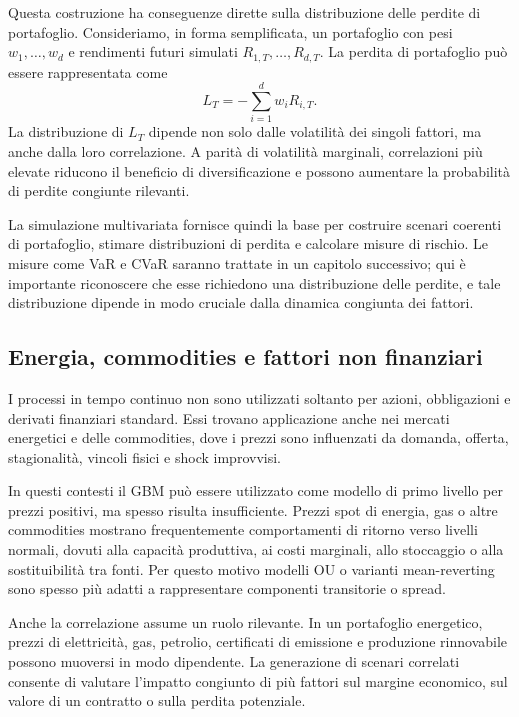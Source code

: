 Questa costruzione ha conseguenze dirette sulla distribuzione delle
perdite di portafoglio. Consideriamo, in forma semplificata, un
portafoglio con pesi $w_1,\ldots,w_d$ e rendimenti futuri simulati
$R_{1,T},\ldots,R_{d,T}$. La perdita di portafoglio pu\`{o} essere
rappresentata come
\[
L_T
=
-
\sum_{i=1}^{d}
w_i R_{i,T}.
\]
La distribuzione di $L_T$ dipende non solo dalle volatilit\`{a} dei singoli
fattori, ma anche dalla loro correlazione. A parit\`{a} di volatilit\`{a}
marginali, correlazioni pi\`{u} elevate riducono il beneficio di
diversificazione e possono aumentare la probabilit\`{a} di perdite
congiunte rilevanti.

La simulazione multivariata fornisce quindi la base per costruire scenari
coerenti di portafoglio, stimare distribuzioni di perdita e calcolare
misure di rischio. Le misure come VaR e CVaR saranno trattate in un
capitolo successivo; qui \`{e} importante riconoscere che esse richiedono
una distribuzione delle perdite, e tale distribuzione dipende in modo
cruciale dalla dinamica congiunta dei fattori.

\subsection*{Energia, commodities e fattori non finanziari}

I processi in tempo continuo non sono utilizzati soltanto per azioni,
obbligazioni e derivati finanziari standard. Essi trovano applicazione
anche nei mercati energetici e delle commodities, dove i prezzi sono
influenzati da domanda, offerta, stagionalit\`{a}, vincoli fisici e shock
improvvisi.

In questi contesti il GBM pu\`{o} essere utilizzato come modello di primo
livello per prezzi positivi, ma spesso risulta insufficiente. Prezzi spot
di energia, gas o altre commodities mostrano frequentemente comportamenti
di ritorno verso livelli normali, dovuti alla capacit\`{a} produttiva, ai
costi marginali, allo stoccaggio o alla sostituibilit\`{a} tra fonti. Per
questo motivo modelli OU o varianti mean-reverting sono spesso pi\`{u}
adatti a rappresentare componenti transitorie o spread.

Anche la correlazione assume un ruolo rilevante. In un portafoglio
energetico, prezzi di elettricit\`{a}, gas, petrolio, certificati di
emissione e produzione rinnovabile possono muoversi in modo dipendente.
La generazione di scenari correlati consente di valutare l'impatto
congiunto di pi\`{u} fattori sul margine economico, sul valore di un
contratto o sulla perdita potenziale.

